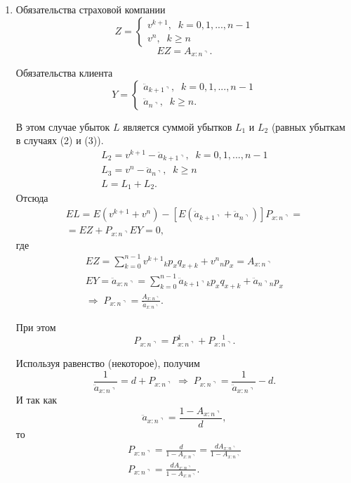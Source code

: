 \begin{enumerate}
	\item {}

	Обязательства страховой компании 
	\[
		Z=\begin{cases}
			v^{k+1}, \;\; k=0,1,...,n-1\\
			v^n, \;\; k \geq n
		\end{cases}
	\]
	\[ EZ = A_{x:n\urcorner}.\]

	Обязательства клиента 
	\[
		Y=\begin{cases}
			\ddot{a}_{k+1\urcorner}, \;\; k=0,1,...,n-1\\
			\ddot{a}_{n\urcorner}, \;\; k \geq n.
		\end{cases}
	\]

	В этом случае убыток $ L$ является суммой убытков $ L_1$ и $ L_2$ (равных убыткам в случаях (2) и (3)).
	\begin{gather*}
		L_2 = v^{k+1} - \ddot{a}_{k+1\urcorner}, \;\; k=0,1,...,n-1\\
		L_3 = v^n -  \ddot{a}_{n\urcorner}, \;\; k \geq n\\
		L = L_1 + L_2.
	\end{gather*}
	Отсюда 
	\begin{gather*}
		EL = E(v^{k+1}+v^n) - [E(\ddot{a}_{k+1\urcorner} + \ddot{a}_{n\urcorner})]P_{x:n\urcorner}=\\
		=EZ + P_{x:n\urcorner}EY = 0,
	\end{gather*}
	где
	\begin{gather*}
		EZ = \sum\limits_{k=0}^{n-1}v^{k+1}{}_kp_xq_{x+k}+ v^n{}_np_x = A_{x:n\urcorner}\\
		EY = \ddot{a}_{x:n\urcorner} = \sum\limits_{k=0}^{n-1} \ddot{a}_{k+1\urcorner}{}_kp_xq_{x+k} + \ddot{a}_{n\urcorner}{}_np_x\\
		\Rightarrow\; P_{x:n\urcorner} = \frac{A_{x:n\urcorner}}{\ddot{a}_{x:n\urcorner}}.
	\end{gather*}

	При этом 
	\[ P_{x:n\urcorner} = P_{x:n\urcorner}^{1} + P_{x:n\urcorner}^{\;\;\;\;1}.\]

	Используя равенство (некоторое), получим
	\[ \frac{1}{\ddot{a}_{x:n\urcorner}} = d+ P_{x:n\urcorner} \; \Rightarrow \; P_{x:n\urcorner} = \frac{1}{\ddot{a}_{x:n\urcorner}} - d. \]
	И так как 
	\[ \ddot{a}_{x:n\urcorner} = \frac{1- A_{x:n\urcorner}}{d},  \]
	то 
	\begin{gather*}
		P_{x:n\urcorner} =  \frac{d}{1- A_{x:n\urcorner}} = \frac{dA_{x:n\urcorner}}{1- A_{x:n\urcorner}}\\
		P_{x:n\urcorner} = \frac{dA_{x:n\urcorner}}{1-A_{x:n\urcorner}}.
	\end{gather*}


\end{enumerate}
